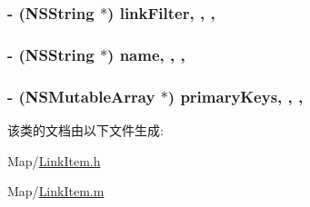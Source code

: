 \hypertarget{interface_link_item_ac1a913e4de4457d2e7fdcc34e7e4d254}{
\subsubsection[{link\-Filter}]{\setlength{\rightskip}{0pt plus 5cm}-\/ (N\-S\-String $\ast$) link\-Filter\hspace{0.3cm}{\ttfamily [read]}, {\ttfamily [write]}, {\ttfamily [atomic]}, {\ttfamily [copy]}}}\label{interface_link_item_ac1a913e4de4457d2e7fdcc34e7e4d254}
\hypertarget{interface_link_item_a85d67fda78ae47f1415897d8330f62df}{
\subsubsection[{name}]{\setlength{\rightskip}{0pt plus 5cm}-\/ (N\-S\-String $\ast$) name\hspace{0.3cm}{\ttfamily [read]}, {\ttfamily [write]}, {\ttfamily [atomic]}, {\ttfamily [copy]}}}\label{interface_link_item_a85d67fda78ae47f1415897d8330f62df}
\hypertarget{interface_link_item_a31d7f4023218fdfef008cec5ae17ea15}{
\subsubsection[{primary\-Keys}]{\setlength{\rightskip}{0pt plus 5cm}-\/ (N\-S\-Mutable\-Array $\ast$) primary\-Keys\hspace{0.3cm}{\ttfamily [read]}, {\ttfamily [write]}, {\ttfamily [atomic]}, {\ttfamily [retain]}}}\label{interface_link_item_a31d7f4023218fdfef008cec5ae17ea15}


该类的文档由以下文件生成\-:\begin{DoxyCompactItemize}
\item 
Map/\hyperlink{_link_item_8h}{Link\-Item.\-h}\item 
Map/\hyperlink{_link_item_8m}{Link\-Item.\-m}\end{DoxyCompactItemize}
